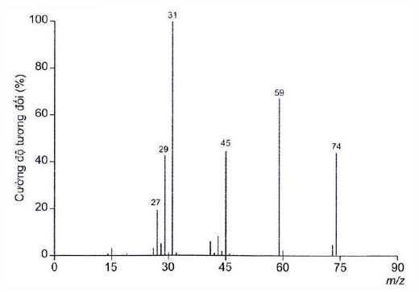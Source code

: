 \documentclass[10pt]{article}
\begin{document}
\includegraphics[max width=\textwidth, center]{2025_10_23_ae7aef68fb3b41082d29g-18(1)}
\end{document}
